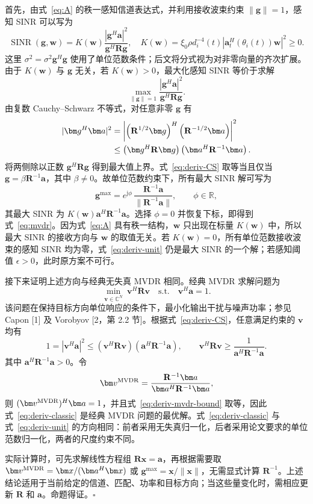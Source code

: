 首先，由式~\eqref{eq:A} 的秩一感知信道表达式，并利用接收波束约束 $\|\bm g\|=1$，感知 SINR 可以写为
\begin{equation}\label{eq:deriv-sinr}
\operatorname{SINR}(\bm g,\bm w)
= K(\bm w)\frac{|\bm g^H\bm a|^2}{\bm g^H\mathbf R\bm g},
\quad
K(\bm w)=\xi_0\rho d_i^{-4}(t)
\left|\bm a_t^H(\theta_i(t))\bm w\right|^2\ge0.
\end{equation}
这里 $\sigma^2=\sigma^2\bm g^H\bm g$ 使用了单位范数条件；后文将分式视为对非零向量的齐次扩展。由于 $K(\bm w)$ 与 $\bm g$ 无关，若 $K(\bm w)>0$，最大化感知 SINR 等价于求解
\begin{equation}\label{eq:deriv-max}
\max_{\|\bm g\|=1}
\frac{|\bm g^H\bm a|^2}{\bm g^H\mathbf R\bm g}.
\end{equation}
由复数 Cauchy--Schwarz 不等式，对任意非零 $\bm g$ 有
\begin{align}\label{eq:deriv-CS}
|\bm g^H\bm a|^2
&=\left|\left(\mathbf R^{1/2}\bm g\right)^H
\left(\mathbf R^{-1/2}\bm a\right)\right|^2\notag\\
&\le \left(\bm g^H\mathbf R\bm g\right)
\left(\bm a^H\mathbf R^{-1}\bm a\right).
\end{align}
将两侧除以正数 $\bm g^H\mathbf R\bm g$ 得到最大值上界。式~\eqref{eq:deriv-CS} 取等当且仅当 $\bm g=\beta\mathbf R^{-1}\bm a$，其中 $\beta\ne0$。故单位范数约束下，所有最大 SINR 解可写为
\begin{equation}\label{eq:deriv-unit}
\bm g^{\max}=e^{\mathrm j\phi}\,
\frac{\mathbf R^{-1}\bm a}{\|\mathbf R^{-1}\bm a\|},
\qquad \phi\in\mathbb R,
\end{equation}
其最大 SINR 为 $K(\bm w)\bm a^H\mathbf R^{-1}\bm a$。选择 $\phi=0$ 并恢复下标，即得到式~\eqref{eq:mvdr}。因为式~\eqref{eq:A} 具有秩一结构，$\bm w$ 只出现在标量 $K(\bm w)$ 中，所以最大 SINR 的接收方向与 $\bm w$ 的取值无关。若 $K(\bm w)=0$，所有单位范数接收波束的感知 SINR 均为零，式~\eqref{eq:deriv-unit} 仍是最大 SINR 的一个解；若感知阈值 $\epsilon>0$，此时原方案不可行。

接下来证明上述方向与经典无失真 MVDR 相同。经典 MVDR 求解问题为
\begin{equation}\label{eq:deriv-mvdr-problem}
\min_{\bm v\in\mathbb C^N}\ \bm v^H\mathbf R\bm v
\quad\text{s.t.}\quad \bm v^H\bm a=1.
\end{equation}
该问题在保持目标方向单位响应的条件下，最小化输出干扰与噪声功率；参见 Capon [1] 及 Vorobyov [2，第 2.2 节]。根据式~\eqref{eq:deriv-CS}，任意满足约束的 $\bm v$ 均有
\begin{equation}\label{eq:deriv-mvdr-bound}
1=|\bm v^H\bm a|^2
\le (\bm v^H\mathbf R\bm v)(\bm a^H\mathbf R^{-1}\bm a),
\qquad
\bm v^H\mathbf R\bm v\ge
\frac{1}{\bm a^H\mathbf R^{-1}\bm a}.
\end{equation}
其中 $\bm a^H\mathbf R^{-1}\bm a>0$。令
\begin{equation}\label{eq:deriv-classic}
\bm v^{\rm MVDR}=
\frac{\mathbf R^{-1}\bm a}{\bm a^H\mathbf R^{-1}\bm a},
\end{equation}
则 $(\bm v^{\rm MVDR})^H\bm a=1$，并且式~\eqref{eq:deriv-mvdr-bound} 取等，因此式~\eqref{eq:deriv-classic} 是经典 MVDR 问题的最优解。式~\eqref{eq:deriv-classic} 与式~\eqref{eq:deriv-unit} 的方向相同：前者采用无失真归一化，后者采用论文要求的单位范数归一化，两者的尺度约束不同。

实际计算时，可先求解线性方程组 $\mathbf R\bm x=\bm a$，再根据需要取 $\bm v^{\rm MVDR}=\bm x/(\bm a^H\bm x)$ 或 $\bm g^{\max}=\bm x/\|\bm x\|$，无需显式计算 $\mathbf R^{-1}$。上述结论适用于当前给定的信道、匹配、功率和目标方向；当这些量变化时，需相应更新 $\mathbf R$ 和 $\bm a$。命题得证。\hfill$\square$

